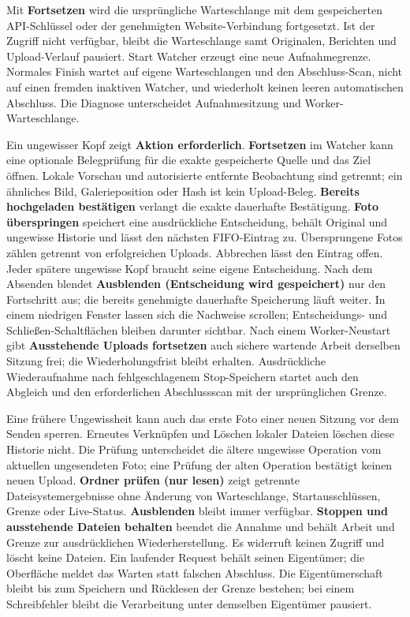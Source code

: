 \documentclass[11pt,a4paper]{article}
\newcommand{\ui}[1]{\textbf{#1}}
\begin{document}
Mit \ui{Fortsetzen} wird die ursprüngliche Warteschlange mit dem gespeicherten
API-Schlüssel oder der genehmigten Website-Verbindung fortgesetzt. Ist der
Zugriff nicht verfügbar, bleibt die Warteschlange samt Originalen, Berichten
und Upload-Verlauf pausiert.
Start Watcher erzeugt eine neue Aufnahmegrenze. Normales Finish wartet auf
eigene Warteschlangen und den Abschluss-Scan, nicht auf einen fremden inaktiven
Watcher, und wiederholt keinen leeren automatischen Abschluss. Die Diagnose
unterscheidet Aufnahmesitzung und Worker-Warteschlange.

Ein ungewisser Kopf zeigt \ui{Aktion erforderlich}. \ui{Fortsetzen} im
Watcher kann eine optionale Belegprüfung für die exakte gespeicherte Quelle
und das Ziel öffnen. Lokale Vorschau und
autorisierte entfernte Beobachtung sind getrennt; ein ähnliches Bild,
Galerieposition oder Hash ist kein Upload-Beleg. \ui{Bereits hochgeladen
bestätigen} verlangt die exakte dauerhafte Bestätigung. \ui{Foto überspringen}
speichert eine ausdrückliche Entscheidung, behält Original und ungewisse
Historie und lässt den nächsten FIFO-Eintrag zu. Übersprungene Fotos zählen
getrennt von erfolgreichen Uploads. Abbrechen lässt den Eintrag offen.
Jeder spätere ungewisse Kopf braucht seine eigene Entscheidung.
Nach dem Absenden blendet \ui{Ausblenden (Entscheidung wird gespeichert)}
nur den Fortschritt aus; die bereits genehmigte dauerhafte Speicherung läuft weiter.
In einem niedrigen Fenster lassen sich die Nachweise scrollen;
Entscheidungs- und Schließen-Schaltflächen bleiben darunter sichtbar.
Nach einem Worker-Neustart gibt \ui{Ausstehende Uploads fortsetzen} auch sichere
wartende Arbeit derselben Sitzung frei; die Wiederholungsfrist bleibt erhalten.
Ausdrückliche Wiederaufnahme nach fehlgeschlagenem Stop-Speichern startet auch
den Abgleich und den erforderlichen Abschlussscan mit der ursprünglichen Grenze.

Eine frühere Ungewissheit kann auch das erste Foto einer neuen Sitzung vor
dem Senden sperren. Erneutes Verknüpfen und Löschen lokaler Dateien löschen
diese Historie nicht. Die Prüfung unterscheidet die ältere ungewisse Operation
vom aktuellen ungesendeten Foto; eine Prüfung der alten Operation bestätigt
keinen neuen Upload. \ui{Ordner prüfen (nur lesen)} zeigt getrennte
Dateisystemergebnisse ohne Änderung von Warteschlange, Startausschlüssen,
Grenze oder Live-Status. \ui{Ausblenden} bleibt immer verfügbar.
\ui{Stoppen und ausstehende Dateien behalten} beendet die Annahme und behält
Arbeit und Grenze zur ausdrücklichen Wiederherstellung. Es widerruft keinen
Zugriff und löscht keine Dateien. Ein laufender Request behält seinen
Eigentümer; die Oberfläche meldet das Warten statt falschen Abschluss.
Die Eigentümerschaft bleibt bis zum Speichern und Rücklesen der Grenze bestehen;
bei einem Schreibfehler bleibt die Verarbeitung unter demselben Eigentümer pausiert.
\end{document}
